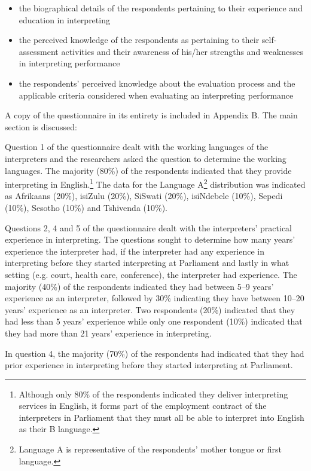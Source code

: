 \documentclass[output=paper]{langsci/langscibook}
\begin{document}
\begin{itemize}
\item the biographical details of the respondents pertaining to their experience and education in interpreting
\item the perceived knowledge of the respondents as pertaining to their self-assessment activities and their awareness of his/her strengths and weaknesses in interpreting performance
\item the respondents’ perceived knowledge about the evaluation process and the applicable criteria considered when evaluating an interpreting performance \end{itemize}

A copy of the questionnaire in its entirety is included in Appendix B.
The main section is discussed:

Question 1 of the questionnaire dealt with the working languages of the interpreters and the researchers asked the question to determine the working languages. The majority (80\%) of the respondents indicated that they provide interpreting in English.\footnote{Although only 80\% of the respondents indicated they deliver interpreting services in English, it forms part of the employment contract of the interpreters in Parliament that they must all be able to interpret into English as their B language.} The data for the Language A\footnote{Language A is representative of the respondents’ mother tongue or first language.}  distribution was indicated as Afrikaans (20\%), isiZulu (20\%), SiSwati (20\%), isiNdebele (10\%), Sepedi (10\%), Sesotho (10\%) and Tshivenda (10\%). 

Questions 2, 4 and 5 of the questionnaire dealt with the interpreters’ practical experience in interpreting. The questions sought to determine how many years’ experience the interpreter had, if the interpreter had any experience in interpreting before they started interpreting at Parliament and lastly in what setting (e.g. court, health care, conference), the interpreter had experience. The majority (40\%) of the respondents indicated they had between 5--9 years’ experience as an interpreter, followed by 30\% indicating they have between 10--20 years’ experience as an interpreter. Two respondents (20\%) indicated that they had less than 5 years’ experience while only one respondent (10\%) indicated that they had more than 21 years’ experience in interpreting.  

In question 4, the majority (70\%) of the respondents had indicated that they had prior experience in interpreting before they started interpreting at Parliament.  
\end{document}
